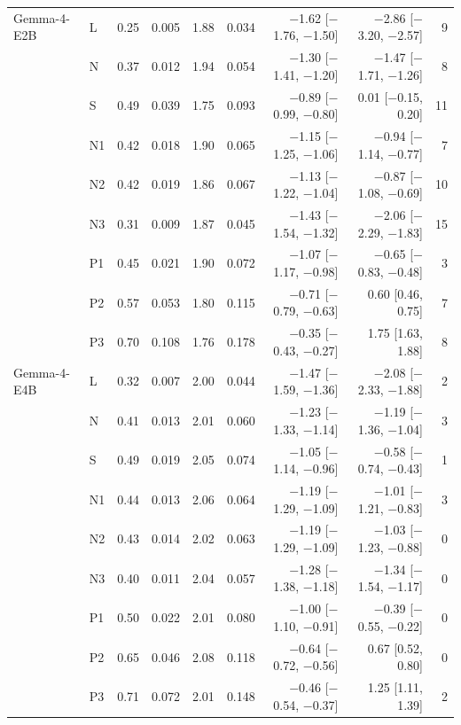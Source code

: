 \begin{tabular}{llrrrrrrr}
\midrule
Gemma-4-E2B & L & 0.25 & 0.005 & 1.88 & 0.034 & $-$1.62 [$-$1.76, $-$1.50] & $-$2.86 [$-$3.20, $-$2.57] & 9 \\
 & N & 0.37 & 0.012 & 1.94 & 0.054 & $-$1.30 [$-$1.41, $-$1.20] & $-$1.47 [$-$1.71, $-$1.26] & 8 \\
 & S & 0.49 & 0.039 & 1.75 & 0.093 & $-$0.89 [$-$0.99, $-$0.80] & 0.01 [$-$0.15, 0.20] & 11 \\
 & N1 & 0.42 & 0.018 & 1.90 & 0.065 & $-$1.15 [$-$1.25, $-$1.06] & $-$0.94 [$-$1.14, $-$0.77] & 7 \\
 & N2 & 0.42 & 0.019 & 1.86 & 0.067 & $-$1.13 [$-$1.22, $-$1.04] & $-$0.87 [$-$1.08, $-$0.69] & 10 \\
 & N3 & 0.31 & 0.009 & 1.87 & 0.045 & $-$1.43 [$-$1.54, $-$1.32] & $-$2.06 [$-$2.29, $-$1.83] & 15 \\
 & P1 & 0.45 & 0.021 & 1.90 & 0.072 & $-$1.07 [$-$1.17, $-$0.98] & $-$0.65 [$-$0.83, $-$0.48] & 3 \\
 & P2 & 0.57 & 0.053 & 1.80 & 0.115 & $-$0.71 [$-$0.79, $-$0.63] & 0.60 [0.46, 0.75] & 7 \\
 & P3 & 0.70 & 0.108 & 1.76 & 0.178 & $-$0.35 [$-$0.43, $-$0.27] & 1.75 [1.63, 1.88] & 8 \\
\midrule
Gemma-4-E4B & L & 0.32 & 0.007 & 2.00 & 0.044 & $-$1.47 [$-$1.59, $-$1.36] & $-$2.08 [$-$2.33, $-$1.88] & 2 \\
 & N & 0.41 & 0.013 & 2.01 & 0.060 & $-$1.23 [$-$1.33, $-$1.14] & $-$1.19 [$-$1.36, $-$1.04] & 3 \\
 & S & 0.49 & 0.019 & 2.05 & 0.074 & $-$1.05 [$-$1.14, $-$0.96] & $-$0.58 [$-$0.74, $-$0.43] & 1 \\
 & N1 & 0.44 & 0.013 & 2.06 & 0.064 & $-$1.19 [$-$1.29, $-$1.09] & $-$1.01 [$-$1.21, $-$0.83] & 3 \\
 & N2 & 0.43 & 0.014 & 2.02 & 0.063 & $-$1.19 [$-$1.29, $-$1.09] & $-$1.03 [$-$1.23, $-$0.88] & 0 \\
 & N3 & 0.40 & 0.011 & 2.04 & 0.057 & $-$1.28 [$-$1.38, $-$1.18] & $-$1.34 [$-$1.54, $-$1.17] & 0 \\
 & P1 & 0.50 & 0.022 & 2.01 & 0.080 & $-$1.00 [$-$1.10, $-$0.91] & $-$0.39 [$-$0.55, $-$0.22] & 0 \\
 & P2 & 0.65 & 0.046 & 2.08 & 0.118 & $-$0.64 [$-$0.72, $-$0.56] & 0.67 [0.52, 0.80] & 0 \\
 & P3 & 0.71 & 0.072 & 2.01 & 0.148 & $-$0.46 [$-$0.54, $-$0.37] & 1.25 [1.11, 1.39] & 2 \\
\bottomrule
\end{tabular}
